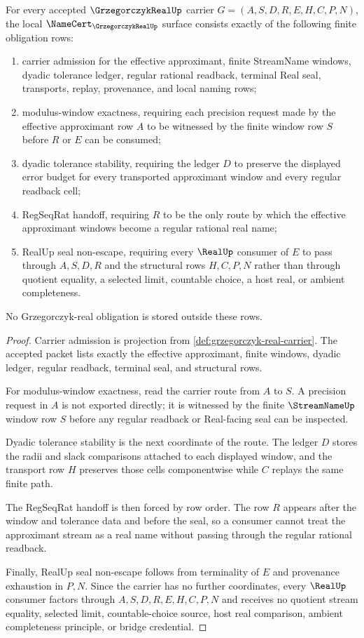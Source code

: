 \begin{theorem}
\label{thm:grzegorczyk-real-namecert-obligations}
For every accepted $\GrzegorczykRealUp$ carrier $G=(A,S,D,R,E,H,C,P,N)$, the local $\NameCert_{\GrzegorczykRealUp}$ surface consists exactly of the following finite obligation rows:
\begin{enumerate}
\item carrier admission for the effective approximant, finite StreamName windows, dyadic tolerance ledger, regular rational readback, terminal Real seal, transports, replay, provenance, and local naming rows;
\item modulus-window exactness, requiring each precision request made by the effective approximant row $A$ to be witnessed by the finite window row $S$ before $R$ or $E$ can be consumed;
\item dyadic tolerance stability, requiring the ledger $D$ to preserve the displayed error budget for every transported approximant window and every regular readback cell;
\item RegSeqRat handoff, requiring $R$ to be the only route by which the effective approximant windows become a regular rational real name;
\item RealUp seal non-escape, requiring every $\RealUp$ consumer of $E$ to pass through $A,S,D,R$ and the structural rows $H,C,P,N$ rather than through quotient equality, a selected limit, countable choice, a host real, or ambient completeness.
\end{enumerate}
No Grzegorczyk-real obligation is stored outside these rows.
\end{theorem}
\begin{proof}
Carrier admission is projection from \autoref{def:grzegorczyk-real-carrier}. The accepted packet lists exactly the effective approximant, finite windows, dyadic ledger, regular readback, terminal seal, and structural rows.

For modulus-window exactness, read the carrier route from $A$ to $S$. A precision request in $A$ is not exported directly; it is witnessed by the finite $\StreamNameUp$ window row $S$ before any regular readback or Real-facing seal can be inspected.

Dyadic tolerance stability is the next coordinate of the route. The ledger $D$ stores the radii and slack comparisons attached to each displayed window, and the transport row $H$ preserves those cells componentwise while $C$ replays the same finite path.

The RegSeqRat handoff is then forced by row order. The row $R$ appears after the window and tolerance data and before the seal, so a consumer cannot treat the approximant stream as a real name without passing through the regular rational readback.

Finally, RealUp seal non-escape follows from terminality of $E$ and provenance exhaustion in $P,N$. Since the carrier has no further coordinates, every $\RealUp$ consumer factors through $A,S,D,R,E,H,C,P,N$ and receives no quotient stream equality, selected limit, countable-choice source, host real comparison, ambient completeness principle, or bridge credential.
\end{proof}

